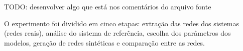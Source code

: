 \documentclass{acm_proc_article-sp}
\begin{document}
TODO: desenvolver algo que está nos comentários do arquivo fonte













O experimento foi dividido em cinco etapas: extração das redes dos sistemas (redes reais), análise do sistema de referência, escolha dos parâmetros dos modelos, geração de redes sintéticas e comparação entre as redes. 
\end{document}

